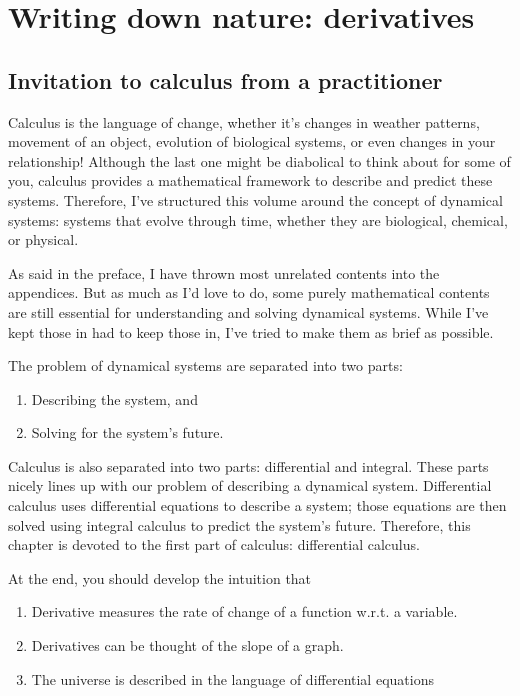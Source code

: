\chapter{Writing down nature: derivatives}
\label{sec:derivatives}


\section{Invitation to calculus from a practitioner}

Calculus is the language of change, whether it's changes in weather patterns, movement of an object, evolution of biological systems, or even changes in your relationship! Although the last one might be diabolical to think about for some of you, calculus provides a mathematical framework to describe and predict these systems. Therefore, I've structured this volume around the concept of dynamical systems: systems that evolve through time, whether they are biological, chemical, or physical.

As said in the preface, I have thrown most unrelated contents into the appendices. But as much as I'd love to do, some purely mathematical contents are still essential for understanding and solving dynamical systems. While I've kept those in had to keep those in, I've tried to make them as brief as possible.

The problem of dynamical systems are separated into two parts:
\begin{enumerate}[noitemsep]
	\item Describing the system, and
	\item Solving for the system's future.
\end{enumerate}
Calculus is also separated into two parts: differential and integral. These parts nicely lines up with our problem of describing a dynamical system. Differential calculus uses differential equations to describe a system; those equations are then solved using integral calculus to predict the system's future. Therefore, this chapter is devoted to the first part of calculus: differential calculus.

At the end, you should develop the intuition that
\begin{enumerate}[noitemsep]
    \item Derivative measures the rate of change of a function w.r.t. a variable.
    \item Derivatives can be thought of the slope of a graph.
    \item The universe is described in the language of differential equations
\end{enumerate}

